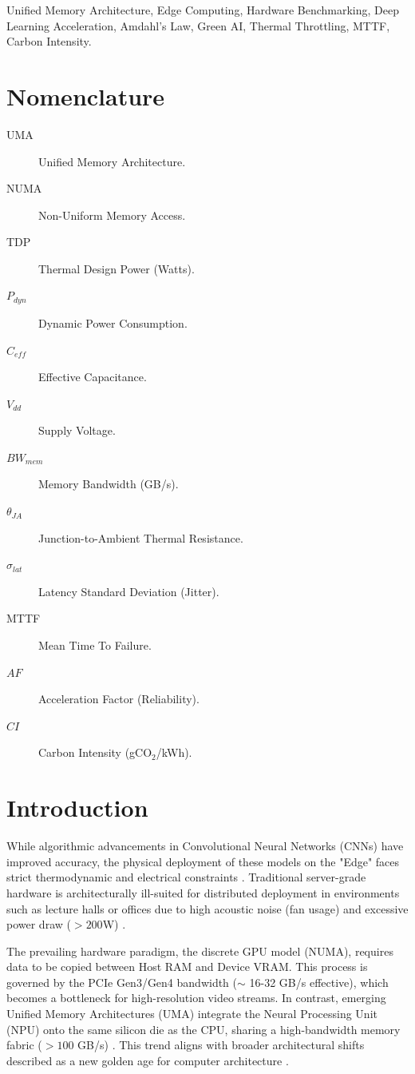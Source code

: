 \documentclass[conference]{IEEEtran}
\begin{document}
\begin{IEEEkeywords}
Unified Memory Architecture, Edge Computing, Hardware Benchmarking, Deep Learning Acceleration, Amdahl's Law, Green AI, Thermal Throttling, MTTF, Carbon Intensity.
\end{IEEEkeywords}

\section*{Nomenclature}
\begin{description}
    \item[UMA] Unified Memory Architecture.
    \item[NUMA] Non-Uniform Memory Access.
    \item[TDP] Thermal Design Power (Watts).
    \item[$P_{dyn}$] Dynamic Power Consumption.
    \item[$C_{eff}$] Effective Capacitance.
    \item[$V_{dd}$] Supply Voltage.
    \item[$BW_{mem}$] Memory Bandwidth (GB/s).
    \item[$\theta_{JA}$] Junction-to-Ambient Thermal Resistance.
    \item[$\sigma_{lat}$] Latency Standard Deviation (Jitter).
    \item[MTTF] Mean Time To Failure.
    \item[$AF$] Acceleration Factor (Reliability).
    \item[$CI$] Carbon Intensity (gCO$_2$/kWh).
\end{description}

\section{Introduction}
While algorithmic advancements in Convolutional Neural Networks (CNNs) have improved accuracy, the physical deployment of these models on the "Edge" faces strict thermodynamic and electrical constraints \cite{b15}. Traditional server-grade hardware is architecturally ill-suited for distributed deployment in environments such as lecture halls or offices due to high acoustic noise (fan usage) and excessive power draw ($>200$W) \cite{b5}.

The prevailing hardware paradigm, the discrete GPU model (NUMA), requires data to be copied between Host RAM and Device VRAM. This process is governed by the PCIe Gen3/Gen4 bandwidth ($\sim$ 16-32 GB/s effective), which becomes a bottleneck for high-resolution video streams. In contrast, emerging Unified Memory Architectures (UMA) integrate the Neural Processing Unit (NPU) onto the same silicon die as the CPU, sharing a high-bandwidth memory fabric ($>100$ GB/s) \cite{b16, b11}. This trend aligns with broader architectural shifts described as a new golden age for computer architecture \cite{b29}.
\end{document}
